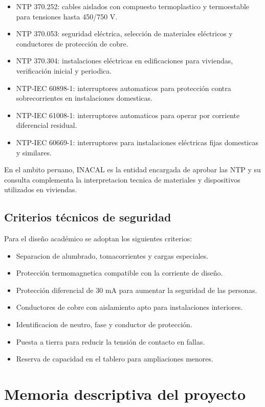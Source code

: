 \begin{itemize}
  \item NTP 370.252: cables aislados con compuesto termoplastico y termoestable para tensiones hasta 450/750 V.
  \item NTP 370.053: seguridad eléctrica, selección de materiales eléctricos y conductores de protección de cobre.
  \item NTP 370.304: instalaciones eléctricas en edificaciones para viviendas, verificación inicial y periodica.
  \item NTP-IEC 60898-1: interruptores automaticos para protección contra sobrecorrientes en instalaciones domesticas.
  \item NTP-IEC 61008-1: interruptores automaticos para operar por corriente diferencial residual.
  \item NTP-IEC 60669-1: interruptores para instalaciones eléctricas fijas domesticas y similares.
\end{itemize}

En el ambito peruano, INACAL es la entidad encargada de aprobar las NTP y su consulta complementa la interpretacion tecnica de materiales y dispositivos utilizados en viviendas.

\subsection{Criterios técnicos de seguridad}

Para el diseño académico se adoptan los siguientes criterios:

\begin{itemize}
  \item Separacion de alumbrado, tomacorrientes y cargas especiales.
  \item Protección termomagnetica compatible con la corriente de diseño.
  \item Protección diferencial de 30 mA para aumentar la seguridad de las personas.
  \item Conductores de cobre con aislamiento apto para instalaciones interiores.
  \item Identificacion de neutro, fase y conductor de protección.
  \item Puesta a tierra para reducir la tensión de contacto en fallas.
  \item Reserva de capacidad en el tablero para ampliaciones menores.
\end{itemize}

\section{Memoria descriptiva del proyecto}

